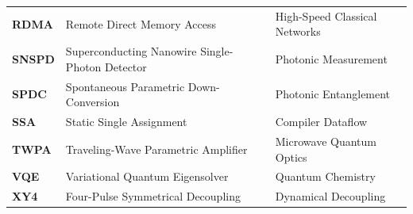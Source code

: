 \begin{tabularx}{\textwidth}{llX}
    \textbf{RDMA} & Remote Direct Memory Access & High-Speed Classical Networks \\
    \textbf{SNSPD} & Superconducting Nanowire Single-Photon Detector & Photonic Measurement \\
    \textbf{SPDC} & Spontaneous Parametric Down-Conversion & Photonic Entanglement \\
    \textbf{SSA} & Static Single Assignment & Compiler Dataflow \\
    \textbf{TWPA} & Traveling-Wave Parametric Amplifier & Microwave Quantum Optics \\
    \textbf{VQE} & Variational Quantum Eigensolver & Quantum Chemistry \\
    \textbf{XY4} & Four-Pulse Symmetrical Decoupling & Dynamical Decoupling \\
    \bottomrule
\end{tabularx}
